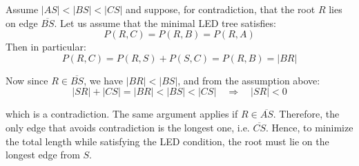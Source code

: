 \documentclass[12pt]{article}
\newcommand{\Price}[2]{P(#1,#2)}
\begin{document}
	Assume \( |AS| < |BS| < |CS| \) and suppose, for contradiction, that the root \( R \) lies on edge \( \overline{BS} \).  
	Let us assume that the minimal LED tree satisfies:
	\[
	\Price{R}{C} = \Price{R}{B} = \Price{R}{A}
	\]
	Then in particular:
	\[
	\Price{R}{C} = \Price{R}{S} + \Price{S}{C} = \Price{R}{B} = |BR|
	\]
	
	Now since \( R \in \overline{BS} \), we have \( |BR| < |BS| \), and from the assumption above:
	\[
	|SR| + |CS| = |BR| < |BS| < |CS|
	\quad \Rightarrow \quad |SR| < 0
	\]
	
	which is a contradiction.  
	The same argument applies if \( R \in \overline{AS} \).  
	Therefore, the only edge that avoids contradiction is the longest one, i.e. \( \overline{CS} \).  
	Hence, to minimize the total length while satisfying the LED condition, the root must lie on the longest edge from \( S \).
	
	
	
\end{document}
